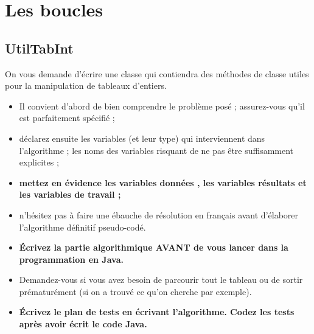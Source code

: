 \documentclass[11pt,a4paper]{article}
\begin{document}
            \begin{abstract}
			Ces exercices ont pour but de v\'erifier que vous avez fix\'e les structures alternatives qui permettent de conditionner
      des parties d'algorithmes, de code.
		
            \par
        \end{abstract}
				\vspace{-2em}\tableofcontents
				\pagestyle{plain}
            \clearpage
            \fancyhead[L,C,R]{}
            \fancyfoot[L,C]{}
            \fancyfoot[R]{ \scriptsize{\textcolor{gray}{
				InitTableau - page \thepage}}}
				\thispagestyle{fancy}
				\pagestyle{fancy}
	   
            \section{Les boucles}\subsection{UtilTabInt}
					On vous demande d'\'ecrire une classe
					\verb@UtilTabInt@
					qui contiendra des m\'ethodes de classe utiles 
					pour la manipulation de tableaux d'entiers.
				
            \par
        
					\begin{itemize}
				
			\item Il convient d'abord de bien comprendre le probl\`eme pos\'e ; assurez-vous qu'il est parfaitement sp\'ecifi\'e ;
			\item d\'eclarez ensuite les variables (et leur type) qui interviennent dans l'algorithme ; les noms des variables risquant de ne pas \^etre suffisamment explicites ;
			\item \textbf{mettez en \'evidence les variables \guillemotleft  donn\'ees \guillemotright , les variables \guillemotleft  r\'esultats \guillemotright  et les variables de travail ;}
			\item n'h\'esitez pas \`a faire une \'ebauche de r\'esolution en fran\c cais avant d'\'elaborer l'algorithme d\'efinitif pseudo-cod\'e.
			\item \textbf{\'Ecrivez la partie algorithmique AVANT de vous lancer dans la programmation en Java.}
			\item Demandez-vous si vous avez besoin de parcourir tout le tableau ou de sortir pr\'ematur\'ement (si on a trouv\'e ce qu'on cherche par exemple).
			\item \textbf{\'Ecrivez le plan de tests en \'ecrivant l'algorithme. Codez les tests apr\`es avoir \'ecrit le code Java.}
					\end{itemize}
				
\end{document}

